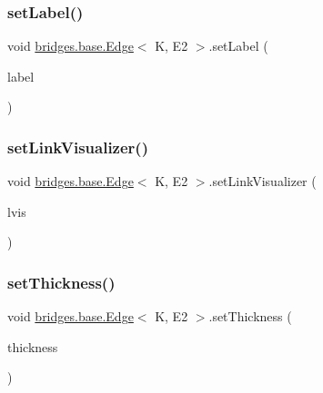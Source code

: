 \subsubsection{\texorpdfstring{setLabel()}{setLabel()}}
{\footnotesize\ttfamily void \mbox{\hyperlink{classbridges_1_1base_1_1_edge}{bridges.\+base.\+Edge}}$<$ K, E2 $>$.set\+Label (\begin{DoxyParamCaption}\item[{String}]{label }\end{DoxyParamCaption})}

\mbox{\label{classbridges_1_1base_1_1_edge_a1bb8008507d26245468bf9d0f1452072}} 
\subsubsection{\texorpdfstring{setLinkVisualizer()}{setLinkVisualizer()}}
{\footnotesize\ttfamily void \mbox{\hyperlink{classbridges_1_1base_1_1_edge}{bridges.\+base.\+Edge}}$<$ K, E2 $>$.set\+Link\+Visualizer (\begin{DoxyParamCaption}\item[{\mbox{\hyperlink{classbridges_1_1base_1_1_link_visualizer}{Link\+Visualizer}}}]{lvis }\end{DoxyParamCaption})}

\mbox{\label{classbridges_1_1base_1_1_edge_ae8d87539f03f04479e5f5710ea9bf260}} 
\subsubsection{\texorpdfstring{setThickness()}{setThickness()}}
{\footnotesize\ttfamily void \mbox{\hyperlink{classbridges_1_1base_1_1_edge}{bridges.\+base.\+Edge}}$<$ K, E2 $>$.set\+Thickness (\begin{DoxyParamCaption}\item[{double}]{thickness }\end{DoxyParamCaption})}

\mbox{\label{classbridges_1_1base_1_1_edge_a5e574139711be3f96c42da02a2702aea}} 
